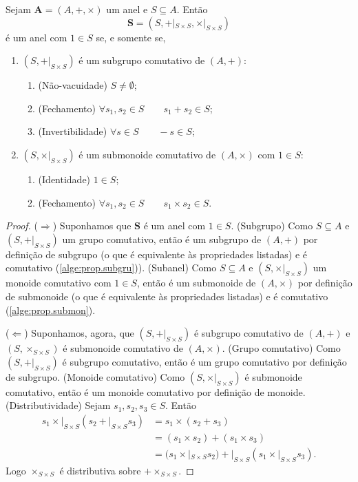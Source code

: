 \begin{prop}
Sejam $\bm A=(A,+,\times)$ um anel e $S \subseteq A$. Então
	\begin{equation*}
	\bm S=(S,+|_{S \times S},\times|_{S \times S})
	\end{equation*}
é um anel com $1 \in S$ se, e somente se,
	\begin{enumerate}
	\item $(S,+|_{S \times S})$ é um subgrupo comutativo de $(A,+)$:
			\begin{enumerate}
			\item (Não-vacuidade) $S \neq \emptyset$;
			\item (Fechamento) $\forall s_1,s_2 \in S \qquad s_1 + s_2 \in S$;
			\item (Invertibilidade) $\forall s \in S \qquad -s \in S$;
			\end{enumerate}
	\item $(S,\times|_{S \times S})$ é um submonoide comutativo de $(A,\times)$ com $1 \in S$:
			\begin{enumerate}
			\item (Identidade) $1 \in S$;
			\item (Fechamento) $\forall s_1,s_2 \in S \qquad s_1 \times s_2 \in S$.
			\end{enumerate}
	\end{enumerate}
\end{prop}
\begin{proof}
($\Rightarrow$) Suponhamos que $\bm S$ é um anel com $1 \in S$.
(Subgrupo) Como $S \subseteq A$ e $(S,+|_{S \times S})$ um grupo comutativo, então é um subgrupo de $(A,+)$ por definição de subgrupo (o que é equivalente às propriedades listadas) e é comutativo (\ref{alge:prop.subgru})).
(Subanel)  Como $S \subseteq A$ e $(S,\times|_{S \times S})$ um monoide comutativo com $1 \in S$, então é um submonoide de $(A,\times)$ por definição de submonoide (o que é equivalente às propriedades listadas) e é comutativo (\ref{alge:prop.submon}).

($\Leftarrow$) Suponhamos, agora, que $(S,+|_{S \times S})$ é subgrupo comutativo de $(A,+)$ e $(S,\times_{S \times S})$ é submonoide comutativo de $(A,\times)$.
(Grupo comutativo) Como $(S,+|_{S \times S})$ é subgrupo comutativo, então é um grupo comutativo por definição de subgrupo. (Monoide comutativo) Como $(S,\times|_{S \times S})$ é submonoide comutativo, então é um monoide comutativo por definição de monoide. (Distributividade) Sejam $s_1,s_2,s_3 \in S$. Então
	\begin{align*}
	s_1 \times|_{S \times S} (s_2 +|_{S \times S} s_3) &= s_1 \times (s_2 + s_3) \\
		&= (s_1 \times s_2) + (s_1 \times s_3) \\
		&= (s_1 \times| _{S \times S} s_2) +|_{S \times S} (s_1 \times|_{S \times S} s_3).
	\end{align*}
Logo $\times_{S \times S}$ é distributiva sobre $+ \times_{S \times S}$.
\end{proof}

